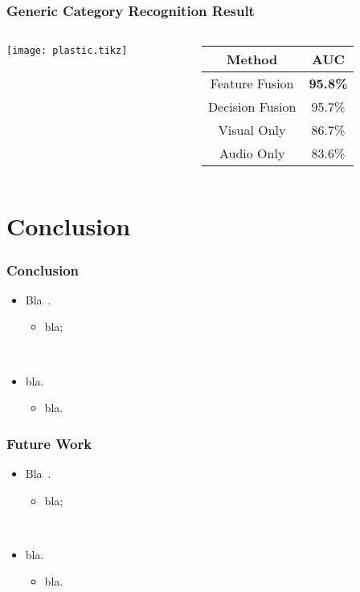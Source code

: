 \documentclass{beamer}
\begin{document}
  \begin{frame}
    \frametitle{Generic Category Recognition Result}
    
    \begin{columns}
      \begin{column}{.6\textwidth}
        \centering
        \footnotesize
        \texttt{[image: plastic.tikz]}
      \end{column}
      \begin{column}{.4\textwidth}
        \footnotesize
        \begin{tabular}[h]{c|c}
          \hline
          Method & AUC \\ \hline \hline
          Feature Fusion & \textbf{95.8\%} \\ \hline
          Decision Fusion  & 95.7\% \\ \hline
          Visual Only & 86.7\% \\ \hline
          Audio Only & 83.6\% \\ \hline
        \end{tabular}
      \end{column}
    \end{columns}
  \end{frame}

  \section{Conclusion}
  \begin{frame}
    \frametitle{Conclusion}

    \begin{itemize}
      \item Bla~\cite{rabiner_fundamentals_1993}.
        \begin{itemize}
          \item bla; 
        \end{itemize}
        ~

      \item bla.
        \begin{itemize}
          \item bla.
        \end{itemize}
    \end{itemize}
  \end{frame}

  \begin{frame}
    \frametitle{Future Work}

    \begin{itemize}
      \item Bla~\cite{rabiner_fundamentals_1993}.
        \begin{itemize}
          \item bla; 
        \end{itemize}
        ~

      \item bla.
        \begin{itemize}
          \item bla.
        \end{itemize}
    \end{itemize}
  \end{frame}
\end{document}
